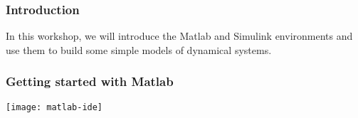 \documentclass[9pt]{beamer-control}
\begin{document}

\begin{frame}
\frametitle{Introduction}
In this workshop, we will introduce the Matlab and Simulink environments and use them to build some simple models of dynamical systems.
\end{frame}


\begin{frame}[fragile]
\frametitle{Getting started with Matlab}

\texttt{[image: matlab-ide]}


\end{frame}
\end{document}
